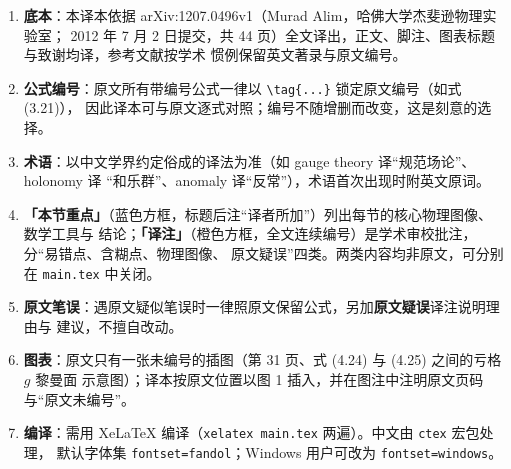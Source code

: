 \begin{enumerate}[leftmargin=1.8em,itemsep=2pt,topsep=4pt]
  \item \textbf{底本}：本译本依据 arXiv:1207.0496v1（Murad Alim，哈佛大学杰斐逊物理实验室；
        2012 年 7 月 2 日提交，共 44 页）全文译出，正文、脚注、图表标题与致谢均译，参考文献按学术
        惯例保留英文著录与原文编号。
  \item \textbf{公式编号}：原文所有带编号公式一律以 \verb|\tag{...}| 锁定原文编号（如式 (3.21)），
        因此译本可与原文逐式对照；编号不随增删而改变，这是刻意的选择。
  \item \textbf{术语}：以中文学界约定俗成的译法为准（如 gauge theory 译“规范场论”、holonomy 译
        “和乐群”、anomaly 译“反常”），术语首次出现时附英文原词。
  \item \textbf{「本节重点」}（蓝色方框，标题后注“译者所加”）列出每节的核心物理图像、数学工具与
        结论；\textbf{「译注」}（橙色方框，全文连续编号）是学术审校批注，分“易错点、含糊点、物理图像、
        原文疑误”四类。两类内容均非原文，可分别在 \verb|main.tex| 中关闭。
  \item \textbf{原文笔误}：遇原文疑似笔误时一律照原文保留公式，另加\textbf{原文疑误}译注说明理由与
        建议，不擅自改动。
  \item \textbf{图表}：原文只有一张未编号的插图（第 31 页、式 (4.24) 与 (4.25) 之间的亏格 $g$ 黎曼面
        示意图）；译本按原文位置以图 1 插入，并在图注中注明原文页码与“原文未编号”。
  \item \textbf{编译}：需用 XeLaTeX 编译（\verb|xelatex main.tex| 两遍）。中文由 \verb|ctex| 宏包处理，
        默认字体集 \verb|fontset=fandol|；Windows 用户可改为 \verb|fontset=windows|。
\end{enumerate}

\clearpage
\tableofcontents
\clearpage
